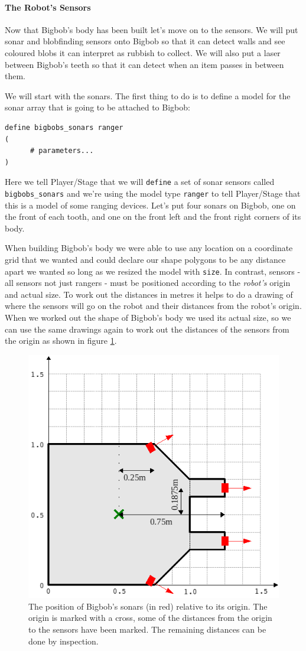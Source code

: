 \documentclass[a4paper]{article}
\newcommand{\plst}{Player/Stage\xspace}
\begin{document}
\paragraph{The Robot's Sensors}\label{sec:examplerobotsensors}
Now that Bigbob's body has been built let's move on to the sensors. We will put sonar and blobfinding sensors onto Bigbob so that it can detect walls and see coloured blobs it can interpret as rubbish to collect. We will also put a laser between Bigbob's teeth so that it can detect when an item passes in between them.

We will start with the sonars. The first thing to do is to define a model for the sonar array that is going to be attached to Bigbob:
\begin{verbatim}
define bigbobs_sonars ranger
(
      # parameters...
)
\end{verbatim}
Here we tell \plst that we will \verb|define| a set of sonar sensors called \verb|bigbobs_sonars| and we're using the model type \verb|ranger| to tell \plst that this is a model of some ranging devices. Let's put four sonars on Bigbob, one on the front of each tooth, and one on the front left and the front right corners of its body. 

When building Bigbob's body we were able to use any location on a coordinate grid that we wanted and could declare our shape polygons to be any distance apart we wanted so long as we resized the model with \verb|size|. In contrast, sensors - all sensors not just rangers - must be positioned according to the \emph{robot's} origin and actual size. To work out the distances in metres it helps to do a drawing of where the sensors will go on the robot and their distances from the robot's origin. When we worked out the shape of Bigbob's body we used its actual size, so we can use the same drawings again to work out the distances of the sensors from the origin as shown in figure \ref{fig:sonardrawing}.

\begin{figure}
	\centering
	\includegraphics[width=0.6\linewidth]{./pics/robot_building/bigbob_sonars.png} 
	\caption{The position of Bigbob's sonars (in red) relative to its origin. The origin is marked with a cross, some of the distances from the origin to the sensors have been marked. The remaining distances can be done by inspection.}
	\label{fig:sonardrawing}
\end{figure}
\end{document}
